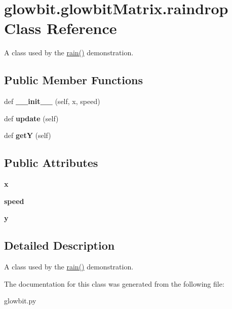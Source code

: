\hypertarget{classglowbit_1_1glowbitMatrix_1_1raindrop}{}\section{glowbit.\+glowbit\+Matrix.\+raindrop Class Reference}
\label{classglowbit_1_1glowbitMatrix_1_1raindrop}


A class used by the \hyperlink{classglowbit_1_1glowbitMatrix_a088608e2586a76f09eb7312f2155f0b8}{rain()} demonstration.  


\subsection*{Public Member Functions}
\begin{DoxyCompactItemize}
\item 
\mbox{\label{classglowbit_1_1glowbitMatrix_1_1raindrop_a5368f364866f8e2bbbb430f7bce8909c}} 
def {\bfseries \+\_\+\+\_\+init\+\_\+\+\_\+} (self, x, speed)
\item 
\mbox{\label{classglowbit_1_1glowbitMatrix_1_1raindrop_aeb03aa245ab1507c74474f6ed7918aa4}} 
def {\bfseries update} (self)
\item 
\mbox{\label{classglowbit_1_1glowbitMatrix_1_1raindrop_a8139214ebb75e44097147c61d254de5f}} 
def {\bfseries getY} (self)
\end{DoxyCompactItemize}
\subsection*{Public Attributes}
\begin{DoxyCompactItemize}
\item 
\mbox{\label{classglowbit_1_1glowbitMatrix_1_1raindrop_a4c481273b383e7ceed52eaa0f39a1a0a}} 
{\bfseries x}
\item 
\mbox{\label{classglowbit_1_1glowbitMatrix_1_1raindrop_ade3f6775e6494d001f52e04ae5626fcb}} 
{\bfseries speed}
\item 
\mbox{\label{classglowbit_1_1glowbitMatrix_1_1raindrop_a59a8135a4a81b2fa5f2cbfb225cf1575}} 
{\bfseries y}
\end{DoxyCompactItemize}


\subsection{Detailed Description}
A class used by the \hyperlink{classglowbit_1_1glowbitMatrix_a088608e2586a76f09eb7312f2155f0b8}{rain()} demonstration. 

The documentation for this class was generated from the following file\+:\begin{DoxyCompactItemize}
\item 
glowbit.\+py\end{DoxyCompactItemize}
